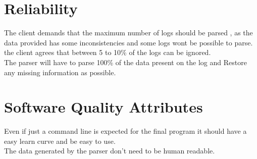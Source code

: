 \documentclass{scrreprt}
\begin{document}
\section{Reliability}
The client demands that the maximum number of logs should be parsed , as the
data provided has some inconsistencies and some logs wont be possible to parse.
the client agrees that between 5 to 10\% of the logs can be ignored.\\

The parser will have to parse 100\% of the data present on the log and Restore
any missing information as possible.\\

\section{Software Quality Attributes}
Even if just a command line is expected for the final program it should have a
easy learn curve and be easy to use.\\
The data generated by the parser don't need to be human readable.\\



\end{document}
